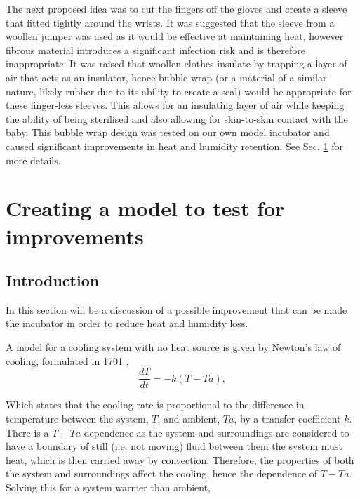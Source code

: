 \documentclass{article}
\begin{document}
 \vspace{3mm}

The next proposed idea was to cut the fingers off the gloves and create a sleeve that fitted tightly around the wrists. It was suggested that the sleeve from a woollen jumper was used as it would be effective at maintaining heat, however fibrous material introduces a significant infection risk and is therefore inappropriate. It was raised that woollen clothes insulate by trapping a layer of air that acts as an insulator, hence bubble wrap (or a material of a similar nature, likely rubber due to its ability to create a seal) would be appropriate for these finger-less sleeves. This allows for an insulating layer of air while keeping the ability of being sterilised and also allowing for skin-to-skin contact with the baby. This bubble wrap design was tested on our own model incubator and caused significant improvements in heat and humidity retention. See Sec. \ref{ModelForImprovements} for more details.  

\section{Creating a model to test for improvements} \label{ModelForImprovements}

\subsection{Introduction} \label{ModelSecIntro}
In this section will be a discussion of a possible improvement that can be made the incubator in order to reduce heat and humidity loss. 

\vspace{3mm}

A model for a cooling system with no heat source is given by Newton’s law of cooling, formulated in 1701 \cite{JR1} \cite{JR2},
\begin{equation} \label{NewtonDerivative}
    \frac{dT}{dt} = -k(T-Ta),
\end{equation}

Which states that the cooling rate is proportional to the difference in temperature between the system, $T$, and ambient, $Ta$, by a transfer coefficient $k$. There is a $T-Ta$ dependence as the system and surroundings are considered to have a boundary of still (i.e. not moving) fluid between them the system must heat, which is then carried away by convection. Therefore, the properties of both the system and surroundings affect the cooling, hence the dependence of $T-Ta$.
Solving this for a system warmer than ambient,
\end{document}

